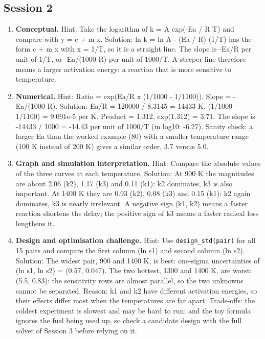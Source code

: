 \documentclass[11pt,a4paper]{article}
\begin{document}
\subsection*{Session 2}
\begin{enumerate}[nosep]
\item \textbf{Conceptual.} Hint: Take the logarithm of k = A exp(-Ea / R T) and compare with y = c + m x. Solution: ln k = ln A - (Ea / R) (1/T) has the form c + m x with x = 1/T, so it is a straight line. The slope is -Ea/R per unit of 1/T, or -Ea/(1000 R) per unit of 1000/T. A steeper line therefore means a larger activation energy: a reaction that is more sensitive to temperature.
\item \textbf{Numerical.} Hint: Ratio = exp(Ea/R x (1/1000 - 1/1100)). Slope = -Ea/(1000 R). Solution: Ea/R = 120000 / 8.3145 = 14433 K. (1/1000 - 1/1100) = 9.091e-5 per K. Product = 1.312, exp(1.312) = 3.71. The slope is -14433 / 1000 = -14.43 per unit of 1000/T (in log10: -6.27). Sanity check: a larger Ea than the worked example (80) with a smaller temperature range (100 K instead of 200 K) gives a similar order, 3.7 versus 5.0.
\item \textbf{Graph and simulation interpretation.} Hint: Compare the absolute values of the three curves at each temperature. Solution: At 900 K the magnitudes are about 2.06 (k2), 1.17 (k3) and 0.11 (k1): k2 dominates, k3 is also important. At 1400 K they are 0.93 (k2), 0.08 (k3) and 0.15 (k1): k2 again dominates, k3 is nearly irrelevant. A negative sign (k1, k2) means a faster reaction shortens the delay; the positive sign of k3 means a faster radical loss lengthens it.
\item \textbf{Design and optimisation challenge.} Hint: Use \texttt{design\_std(pair)} for all 15 pairs and compare the first column (ln s1) and second column (ln s2). Solution: The widest pair, 900 and 1400 K, is best: one-sigma uncertainties of (ln s1, ln s2) = (0.57, 0.047). The two hottest, 1300 and 1400 K, are worst: (5.5, 0.83): the sensitivity rows are almost parallel, so the two unknowns cannot be separated. Reason: k1 and k2 have different activation energies, so their effects differ most when the temperatures are far apart. Trade-offs: the coldest experiment is slowest and may be hard to run; and the toy formula ignores the fuel being used up, so check a candidate design with the full solver of Session 3 before relying on it.
\end{enumerate}
\end{document}
